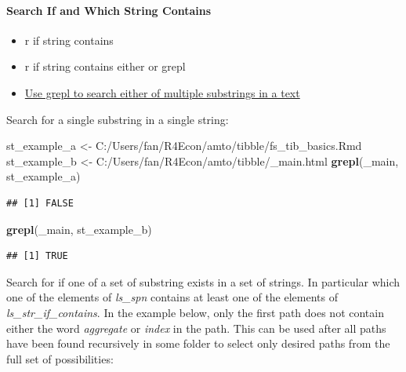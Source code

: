 \documentclass[
]{book}
\newenvironment{Shaded}{\begin{snugshade}}{\end{snugshade}}
\newcommand{\KeywordTok}[1]{\textcolor[rgb]{0.13,0.29,0.53}{\textbf{#1}}}
\newcommand{\NormalTok}[1]{#1}
\newcommand{\StringTok}[1]{\textcolor[rgb]{0.31,0.60,0.02}{#1}}
\providecommand{\tightlist}{%
  \setlength{\itemsep}{0pt}\setlength{\parskip}{0pt}}
\begin{document}
\hypertarget{search-if-and-which-string-contains}{%
\paragraph{Search If and Which String Contains}\label{search-if-and-which-string-contains}}

\begin{itemize}
\tightlist
\item
  r if string contains
\item
  r if string contains either or grepl
\item
  \href{https://stackoverflow.com/a/26319765/8280804}{Use grepl to search either of multiple substrings in a text}
\end{itemize}

Search for a single substring in a single string:

\begin{Shaded}
\begin{Highlighting}[]
\NormalTok{st\_example\_a \textless{}{-}}\StringTok{ \textquotesingle{}C:/Users/fan/R4Econ/amto/tibble/fs\_tib\_basics.Rmd\textquotesingle{}}
\NormalTok{st\_example\_b \textless{}{-}}\StringTok{ \textquotesingle{}C:/Users/fan/R4Econ/amto/tibble/\_main.html\textquotesingle{}}
\KeywordTok{grepl}\NormalTok{(}\StringTok{\textquotesingle{}\_main\textquotesingle{}}\NormalTok{, st\_example\_a)}
\end{Highlighting}
\end{Shaded}

\begin{verbatim}
## [1] FALSE
\end{verbatim}

\begin{Shaded}
\begin{Highlighting}[]
\KeywordTok{grepl}\NormalTok{(}\StringTok{\textquotesingle{}\_main\textquotesingle{}}\NormalTok{, st\_example\_b)}
\end{Highlighting}
\end{Shaded}

\begin{verbatim}
## [1] TRUE
\end{verbatim}

Search for if one of a set of substring exists in a set of strings. In particular which one of the elements of \emph{ls\_spn} contains at least one of the elements of \emph{ls\_str\_if\_contains}. In the example below, only the first path does not contain either the word \emph{aggregate} or \emph{index} in the path. This can be used after all paths have been found recursively in some folder to select only desired paths from the full set of possibilities:
\end{document}
